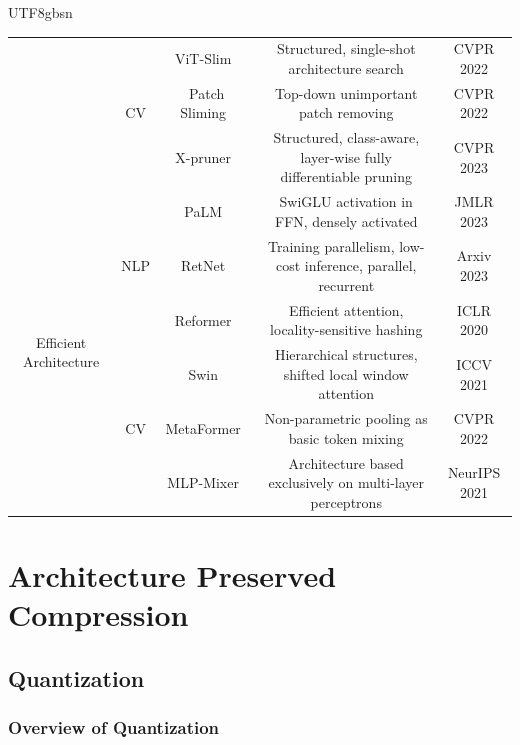 \documentclass[10pt,journal,compsoc]{IEEEtran}
\newcommand{\<}{\left\langle}
\renewcommand{\>}{\right\rangle}
\newcommand{\1}{\mathbbm{1}}
\begin{document}
\begin{CJK}{UTF8}{gbsn}
\begin{table}[htb]
{\begin{tabular}{c|c|c|c|c}
			& \multirow{3}{*}{CV}  & ViT-Slim~\cite{Chavan2022VisionTS}  & Structured, single-shot architecture search & CVPR 2022 \\
			& &Patch Sliming~\cite{Tang2021PatchSF} & Top-down unimportant patch removing & CVPR 2022  \\
			& &X-pruner~\cite{Yu2023XPrunerEP} & Structured, class-aware, layer-wise fully differentiable pruning & CVPR 2023  \\  \hline \hline
			\multirow{6}{*}{{Efficient Architecture}} & \multirow{3}{*}{NLP} & PaLM~\cite{chowdhery2022palm} & SwiGLU activation in FFN, densely activated & JMLR 2023  \\
			& & RetNet~\cite{sun2023retentive} & Training parallelism, low-cost inference, parallel, recurrent & Arxiv 2023  \\
			& & Reformer~\cite{kitaev2020reformer} & Efficient attention, locality-sensitive hashing & ICLR 2020  \\  \cline{2-5}
			& \multirow{3}{*}{CV}  & Swin~\cite{liu2021swin} & Hierarchical structures, shifted local window attention & ICCV 2021  \\
			& & MetaFormer~\cite{yu2022metaformer} & Non-parametric pooling as basic token mixing & CVPR 2022  \\
			& & MLP-Mixer~\cite{tolstikhin2021mlp} & Architecture based exclusively on multi-layer perceptrons & NeurIPS 2021  \\  
			\bottomrule[1.5pt]
		\end{tabular}
	}
\end{table}


\section{Architecture Preserved Compression} 
\label{sec:pres}

\subsection{Quantization}
\subsubsection{Overview of Quantization}




\end{CJK}
\end{document}
